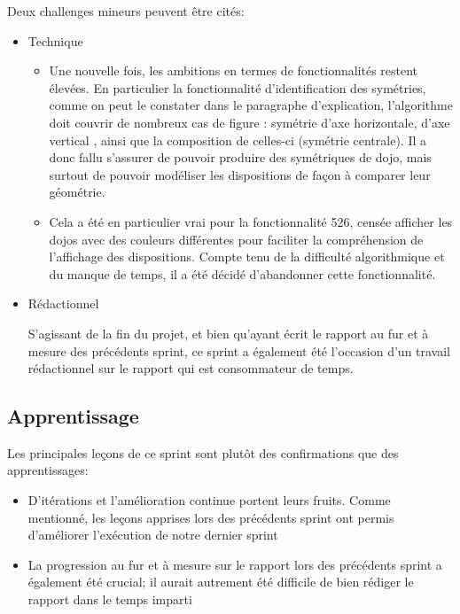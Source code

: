 Deux challenges mineurs peuvent être cités:
\begin{itemize}
    \item Technique
          \begin{itemize}
              \item Une nouvelle fois, les ambitions en termes de fonctionnalités restent élevées. En particulier la fonctionnalité
                    d'identification des symétries, comme on peut le constater dans le paragraphe d’explication, l’algorithme doit couvrir
                    de nombreux cas de figure : symétrie d’axe horizontale, d’axe vertical , ainsi que la composition de celles-ci (symétrie centrale).
                    Il a donc fallu s’assurer de pouvoir produire des symétriques de dojo, mais surtout de pouvoir modéliser les dispositions de façon
                    à comparer leur géométrie.
              \item Cela a été en particulier vrai pour la fonctionnalité 526, censée afficher les dojos avec des couleurs différentes pour faciliter
                    la compréhension de l’affichage des dispositions. Compte tenu de la difficulté algorithmique et du manque de temps, il a été décidé
                    d’abandonner cette fonctionnalité.

          \end{itemize}
    \item Rédactionnel

          S’agissant de la fin du projet, et bien qu’ayant écrit le rapport au fur et à mesure des précédents sprint, ce sprint a également été
          l’occasion d’un travail rédactionnel sur le rapport qui est consommateur de temps.

\end{itemize}

\subsection{Apprentissage}

Les principales leçons de ce sprint sont plutôt des confirmations que des apprentissages:
\begin{itemize}
    \item D'itérations et l'amélioration continue portent leurs fruits. Comme mentionné, les leçons apprises lors des précédents sprint
          ont permis d'améliorer l'exécution de notre dernier sprint
    \item La progression au fur et à mesure sur le rapport lors des précédents sprint a également été crucial; il aurait autrement été
          difficile de bien rédiger le rapport dans le temps imparti
\end{itemize}

